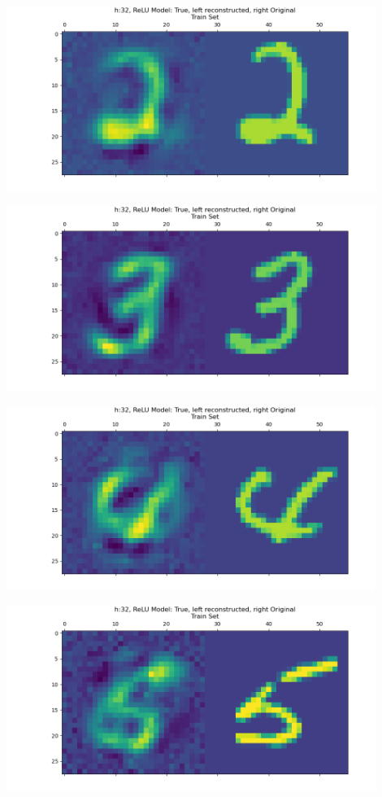 \documentclass[]{article}
\begin{document}
            \begin{center}
                \includegraphics*[width=12cm]{A4plots/06-50-23-h-32-nonlin-digit-2.png}
            \end{center}  
            \begin{center}
                \includegraphics*[width=12cm]{A4plots/06-50-23-h-32-nonlin-digit-3.png}
            \end{center}  
            \begin{center}
                \includegraphics*[width=12cm]{A4plots/06-50-23-h-32-nonlin-digit-4.png}
            \end{center}  
            \begin{center}
                \includegraphics*[width=12cm]{A4plots/06-50-23-h-32-nonlin-digit-5.png}
            \end{center}  
\end{document}
